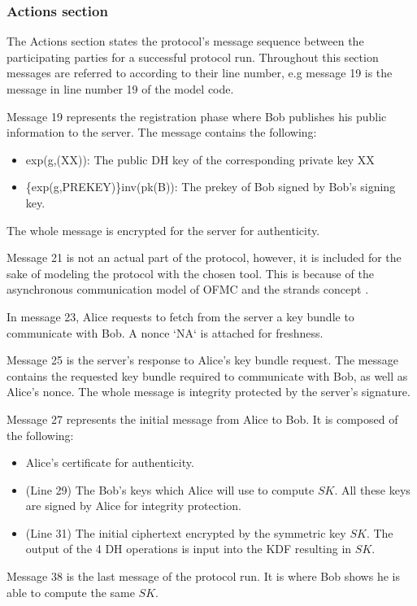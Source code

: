 \subsubsection{Actions section}
The Actions section states the protocol's message sequence between the participating parties for a successful protocol run. Throughout this section messages are referred to according to their line number, e.g message 19 is the message in line number 19 of the model code.
\par
Message 19 represents the registration phase where Bob publishes his public information to the server. The message contains the following:
\begin{itemize}\setlength\itemsep{-0.3em}
	\item exp(g,(XX)): The public DH key of the corresponding private key XX
	\item \{exp(g,PREKEY)\}inv(pk(B)): The prekey of Bob signed by Bob's signing key.
\end{itemize}
The whole message is encrypted for the server for authenticity.
\par
Message 21 is not an actual part of the protocol, however, it is included for the sake of modeling the protocol with the chosen tool. This is because of the asynchronous communication model of OFMC and the strands concept \cite{ofmcTut}.
\par 
In message 23, Alice requests to fetch from the server a key bundle to communicate with Bob. A nonce `NA` is attached for freshness.
\par
Message 25 is the server's response to Alice's key bundle request. The message contains the requested key bundle required to communicate with Bob, as well as Alice's nonce. The whole message is integrity protected by the server's signature.
\par
Message 27 represents the initial message from Alice to Bob. It is composed of the following:
\begin{itemize}\setlength\itemsep{-0.3em}
	\item Alice's certificate for authenticity.
	\item (Line 29) The Bob's keys which Alice will use to compute $ SK $. All these keys are signed by Alice for integrity protection.
	\item (Line 31) The initial ciphertext encrypted by the symmetric key $ SK $. The output of the 4 DH operations is input into the KDF resulting in $ SK $. 
\end{itemize}
\par
Message 38 is the last message of the protocol run. It is where Bob shows he is able to compute the same $ SK $. 

